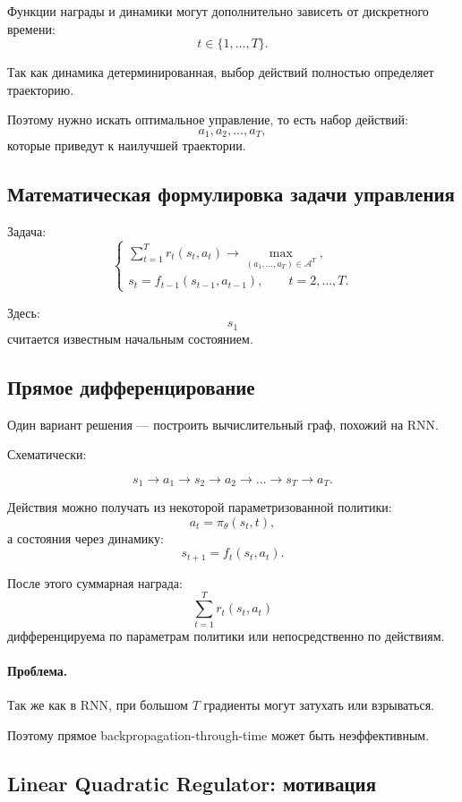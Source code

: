 \documentclass[12pt,a4paper]{article}
\begin{document}
Функции награды и динамики могут дополнительно зависеть от дискретного времени:
\[
t\in\{1,\ldots,T\}.
\]

Так как динамика детерминированная, выбор действий полностью определяет траекторию.

Поэтому нужно искать оптимальное управление, то есть набор действий:
\[
a_1,a_2,\ldots,a_T,
\]
которые приведут к наилучшей траектории.

\subsection{Математическая формулировка задачи управления}

Задача:
\[
\begin{cases}
\displaystyle
\sum_{t=1}^{T}
r_t(s_t,a_t)
\to
\max\limits_{(a_1,\ldots,a_T)\in\mathcal A^T},
\\[1em]
s_t
=
f_{t-1}(s_{t-1},a_{t-1}),
\qquad
t=2,\ldots,T.
\end{cases}
\]

Здесь:
\[
s_1
\]
считается известным начальным состоянием.

\subsection{Прямое дифференцирование}

Один вариант решения --- построить вычислительный граф, похожий на RNN.

Схематически:

\[
s_1
\to
a_1
\to
s_2
\to
a_2
\to
\ldots
\to
s_T
\to
a_T.
\]

Действия можно получать из некоторой параметризованной политики:
\[
a_t=\pi_\theta(s_t,t),
\]
а состояния через динамику:
\[
s_{t+1}=f_t(s_t,a_t).
\]

После этого суммарная награда:
\[
\sum_{t=1}^{T}r_t(s_t,a_t)
\]
дифференцируема по параметрам политики или непосредственно по действиям.

\paragraph{Проблема.}

Так же как в RNN, при большом $T$ градиенты могут затухать или взрываться.

Поэтому прямое backpropagation-through-time может быть неэффективным.

\subsection{Linear Quadratic Regulator: мотивация}
\end{document}
